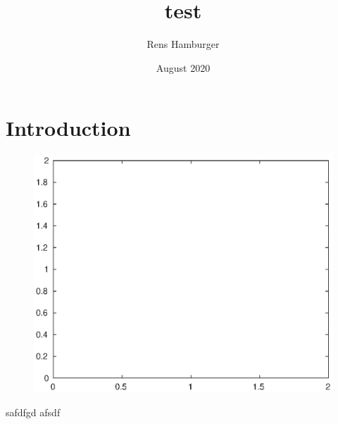 \documentclass{article}
\title{test}
\author{Rens Hamburger}
\date{August 2020}
\begin{document}
\maketitle

\section{Introduction}

\begin{figure}
	\centering
	\includegraphics[width=0.6\linewidth,keepaspectratio]{figures/empty.eps}
\end{figure}
safdfgd
afsdf
\end{document}
